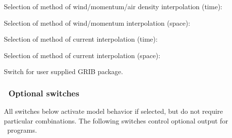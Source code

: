 \noindent
Selection of method of wind/momentum/air density interpolation (time):
\begin{slist}
\end{slist}

\noindent
Selection of method of wind/momentum interpolation (space):
\begin{slist}
\end{slist}

\noindent
Selection of method of current interpolation (time):
\begin{slist}
\end{slist}

\noindent
Selection of method of current interpolation (space):
\begin{slist}
\end{slist}

\noindent
Switch for user supplied GRIB package.
\begin{slist}
\end{slist}

\vsssub
\subsubsection{~Optional switches} \label{sub:opt_switch}
\vsssub

All switches below activate model behavior if selected, but do not require
particular combinations. The following switches control optional output for
\ws\ programs.

